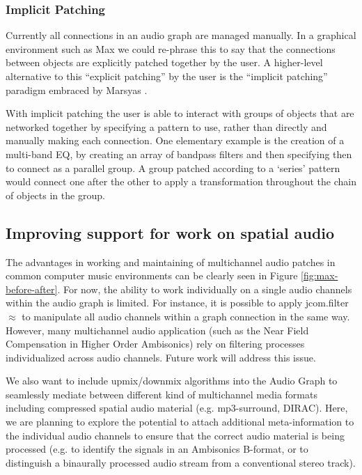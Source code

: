\documentclass[twoside,a4paper]{article}
\begin{document}



\subsubsection{Implicit Patching} %

Currently all connections in an audio graph are managed manually.  In a graphical environment such as Max we could re-phrase this to say that the connections between objects are explicitly patched together by the user.  A higher-level alternative to this ``explicit patching'' by the user is the ``implicit patching'' paradigm embraced by Marsyas \cite{Bray:2005}.

With implicit patching the user is able to interact with groups of objects that are networked together by specifying a pattern to use, rather than directly and manually making each connection.  
One elementary example is the creation of a multi-band EQ, by creating an array of bandpass filters and then specifying then to connect as a parallel group.  
A group patched according to a `series' pattern would connect one after the other to apply a transformation throughout the chain of objects in the group.




\subsection{Improving support for work on spatial audio} %
The advantages in working and maintaining of multichannel audio patches in common computer music environments can be clearly seen in Figure \ref{fig:max-before-after}. 
For now, the ability to work individually on a single audio channels within the audio graph is limited.
For instance, it is possible to apply jcom.filter$\approx$ to manipulate all audio channels within a graph connection in the same way. However, many multichannel audio application (such as the Near Field Compensation in Higher Order Ambisonics) rely on filtering processes individualized across audio channels. Future work will address this issue.

We also want to include upmix/downmix algorithms into the Audio Graph to seamlessly mediate between different kind of multichannel media formats including compressed spatial audio material (e.g. mp3-surround, DIRAC). Here, we are planning to explore the potential to attach additional meta-information to the individual audio channels to ensure that the correct audio material is being processed (e.g. to identify the signals in an Ambisonics B-format, or to distinguish a binaurally processed audio stream from a conventional stereo track). 
\end{document}
